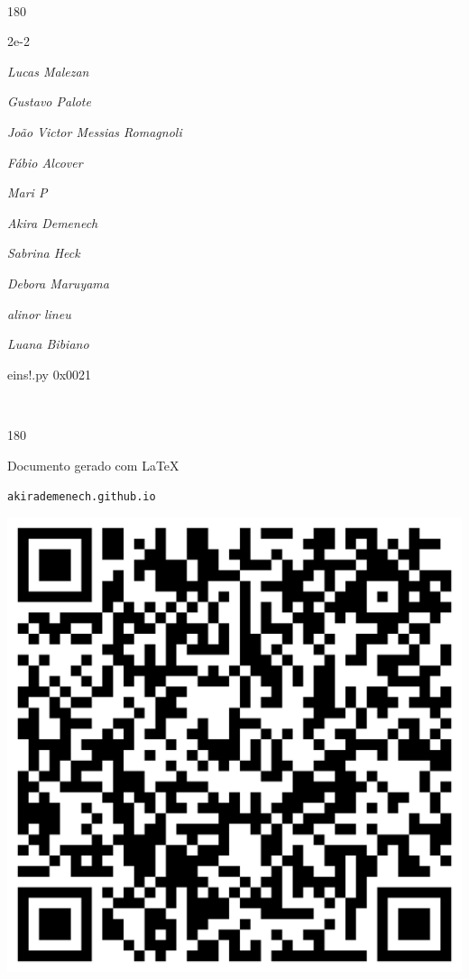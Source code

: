 \documentclass[12pt]{article}
\begin{document}
	\ 
	\vfill
	\begin{turn}{180}	
		\begin{minipage}{\textwidth}
		  	\ttfamily %
			\centering
			{\Huge 2e-2}
		  
			\hfill
		  
			

\textit{\small Lucas Malezan}

\textit{\small Gustavo Palote}

\textit{\small João Victor Messias Romagnoli}

\textit{\small Fábio Alcover}

\textit{\small Mari P}

\textit{\small Akira Demenech}

\textit{\small Sabrina Heck}

\textit{\small Debora Maruyama}

\textit{\small alinor lineu}

\textit{\small Luana Bibiano}

\bigskip

eins!.py
0x0021


		\end{minipage}	
	\end{turn}
	\vfill
	\

\pagebreak

	\begin{turn}{180}	
		\begin{minipage}{\textwidth}		  
		  Documento gerado com \LaTeX			
		  
		  \texttt{akirademenech.github.io}

		  \includegraphics[height=0.3\textheight]{2e-2.pdf}

		\end{minipage}	
	\end{turn}  
		  
\end{document}
